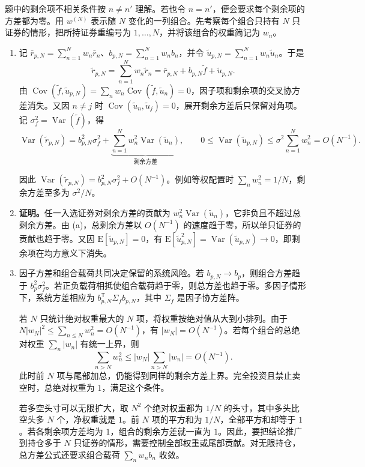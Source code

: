 \begin{solution}[blank-type=manual,blank-vsep=9\baselineskip]
题中的剩余项不相关条件按 $n\ne n'$ 理解。若也令 $n=n'$，便会要求每个剩余项的方差都为零。用 $w^{(N)}$ 表示随 $N$ 变化的一列组合。先考察每个组合只持有 $N$ 只证券的情形，把所持证券重编号为 $1,\ldots,N$，并将该组合的权重简记为 $w_n$。

\begin{enumerate}[label=(\alph*)]
\item 记 $\bar r_{p,N}=\sum_{n=1}^Nw_n\bar r_n$、$b_{p,N}=\sum_{n=1}^Nw_nb_n$，并令 $\widetilde u_{p,N}=\sum_{n=1}^Nw_n\widetilde u_n$。于是
\[
 \widetilde r_{p,N}=\sum_{n=1}^N w_n\widetilde r_n
 =\bar r_{p,N}+b_{p,N}\widetilde f+\widetilde u_{p,N}.
\]
由 $\operatorname{Cov}(\widetilde f,\widetilde u_{p,N})=\sum_nw_n\operatorname{Cov}(\widetilde f,\widetilde u_n)=0$，因子项和剩余项的交叉协方差消失。又因 $n\ne j$ 时 $\operatorname{Cov}(\widetilde u_n,\widetilde u_j)=0$，展开剩余方差后只保留对角项。记 $\sigma_f^2=\operatorname{Var}(\widetilde f)$，得
\[
 \operatorname{Var}(\widetilde r_{p,N})
 =b_{p,N}^2\sigma_f^2+
 \underbrace{\sum_{n=1}^Nw_n^2\operatorname{Var}(\widetilde u_n)}_{\text{剩余方差}},
 \qquad 0\le\operatorname{Var}(\widetilde u_{p,N})\le\sigma^2\sum_{n=1}^Nw_n^2=O(N^{-1}).
\]

因此 $\operatorname{Var}(\widetilde r_{p,N})=b_{p,N}^2\sigma_f^2+O(N^{-1})$。例如等权配置时 $\sum_nw_n^2=1/N$，剩余方差至多为 $\sigma^2/N$。
\item \textbf{证明。}任一入选证券对剩余方差的贡献为 $w_n^2\operatorname{Var}(\widetilde u_n)$，它非负且不超过总剩余方差。由 (a)，总剩余方差以 $O(N^{-1})$ 的速度趋于零，所以单只证券的贡献也趋于零。又因 $\mathrm E[\widetilde u_{p,N}]=0$，有 $\mathrm E[\widetilde u_{p,N}^2]=\operatorname{Var}(\widetilde u_{p,N})\to0$，即剩余项在均方意义下消失。
\item 因子方差和组合载荷共同决定保留的系统风险。若 $b_{p,N}\to b_p$，则组合方差趋于 $b_p^2\sigma_f^2$。若正负载荷相抵使组合载荷趋于零，则总方差也趋于零。多因子情形下，系统方差相应为 $b_{p,N}^{\mathsf T}\Sigma_f b_{p,N}$，其中 $\Sigma_f$ 是因子协方差阵。

若 $N$ 只统计绝对权重最大的 $N$ 项，将权重按绝对值从大到小排列。由于 $N|w_N|^2\le\sum_{n\le N}w_n^2=O(N^{-1})$，有 $|w_N|=O(N^{-1})$。若每个组合的总绝对权重 $\sum_n|w_n|$ 有统一上界，则
\[
 \sum_{n>N}w_n^2\le |w_N|\sum_{n>N}|w_n|=O(N^{-1}).
\]
此时前 $N$ 项与尾部加总，仍能得到同样的剩余方差上界。完全投资且禁止卖空时，总绝对权重为 $1$，满足这个条件。

若多空头寸可以无限扩大，取 $N^2$ 个绝对权重都为 $1/N$ 的头寸，其中多头比空头多 $N$ 个，净权重就是 $1$。前 $N$ 项的平方和为 $1/N$，全部平方和却等于 $1$。若各剩余项方差均为 $1$，组合的剩余方差就一直为 $1$。因此，要把结论推广到持仓多于 $N$ 只证券的情形，需要控制全部权重或尾部贡献。对无限持仓，总方差公式还要求组合载荷 $\sum_n w_nb_n$ 收敛。\qedhere
\end{enumerate}
\end{solution}

